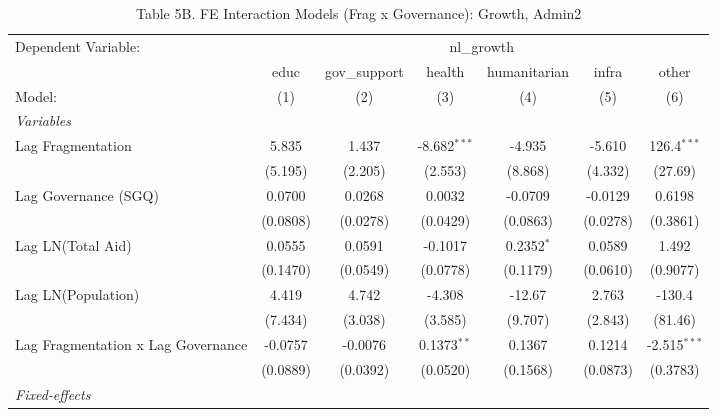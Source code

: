 \par\endgroup



\begin{table}[htbp]
   \caption{Table 5B. FE Interaction Models (Frag x Governance): Growth, Admin2}
   \centering
   \begin{tabular}{lcccccc}
      \tabularnewline \midrule \midrule
      Dependent Variable: & \multicolumn{6}{c}{nl\_growth}\\
                                         & educ     & gov\_support  & health         & humanitarian & infra    & other \\   
      Model:                             & (1)      & (2)           & (3)            & (4)          & (5)      & (6)\\  
      \midrule
      \emph{Variables}\\
      Lag Fragmentation                  & 5.835    & 1.437         & -8.682$^{***}$ & -4.935       & -5.610   & 126.4$^{***}$\\   
                                         & (5.195)  & (2.205)       & (2.553)        & (8.868)      & (4.332)  & (27.69)\\   
      Lag Governance (SGQ)               & 0.0700   & 0.0268        & 0.0032         & -0.0709      & -0.0129  & 0.6198\\   
                                         & (0.0808) & (0.0278)      & (0.0429)       & (0.0863)     & (0.0278) & (0.3861)\\   
      Lag LN(Total Aid)                  & 0.0555   & 0.0591        & -0.1017        & 0.2352$^{*}$ & 0.0589   & 1.492\\   
                                         & (0.1470) & (0.0549)      & (0.0778)       & (0.1179)     & (0.0610) & (0.9077)\\   
      Lag LN(Population)                 & 4.419    & 4.742         & -4.308         & -12.67       & 2.763    & -130.4\\   
                                         & (7.434)  & (3.038)       & (3.585)        & (9.707)      & (2.843)  & (81.46)\\   
      Lag Fragmentation x Lag Governance & -0.0757  & -0.0076       & 0.1373$^{**}$  & 0.1367       & 0.1214   & -2.515$^{***}$\\   
                                         & (0.0889) & (0.0392)      & (0.0520)       & (0.1568)     & (0.0873) & (0.3783)\\   
      \midrule
      \emph{Fixed-effects}\\

\end{tabular}
\end{table}

